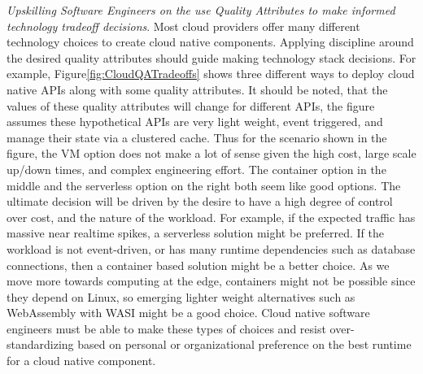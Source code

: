 \documentclass[conference]{IEEEtran}
\begin{document}
\textit{Upskilling Software Engineers on the use Quality Attributes to make informed technology tradeoff decisions}. Most cloud providers offer many different technology choices to create cloud native components.  Applying discipline around the desired quality attributes should guide making technology stack decisions. For example, Figure\ref{fig:CloudQATradeoffs} shows three different ways to deploy cloud native APIs along with some quality attributes.  It should be noted, that the values of these quality attributes will change for different APIs, the figure assumes these hypothetical APIs are very light weight, event triggered, and manage their state via a clustered cache.  Thus for the scenario shown in the figure, the VM option does not make a lot of sense given the high cost, large scale up/down times, and complex engineering effort.  The container option in the middle and the serverless option on the right both seem like good options.  The ultimate decision will be driven by the desire to have a high degree of control over cost, and the nature of the workload. For example, if the expected traffic has massive near realtime spikes, a serverless solution might be preferred. If the workload is not event-driven, or has many runtime dependencies such as database connections, then a container based solution might be a better choice. As we move more towards computing at the edge, containers might not be possible since they depend on Linux, so emerging lighter weight alternatives such as WebAssembly with WASI\cite{WASI} might be a good choice.  Cloud native software engineers must be able to make these types of choices and resist over-standardizing based on personal or organizational preference on the best runtime for a cloud native component. 
\end{document}

